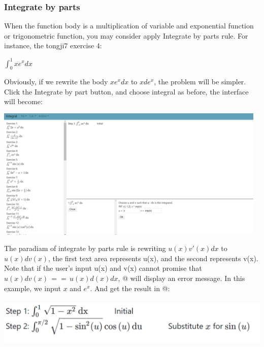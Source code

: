 \documentclass[titlepage]{article}
\makeatletter
\newcommand*{\rom}[1]{\expandafter\@slowromancap\romannumeral #1@}
\makeatother
\begin{document}
\subsubsection{Integrate by parts}
When the function body is a multiplication of variable and exponential function or trigonometric function, you may consider apply Integrate by parts rule. For instance, the tongji7 exercise 4:
\begin{center}
$\int_{0}^{1} xe^{x} dx$
\end{center}
Obviously, if we rewrite the body $xe^{x} dx$ to $x de^{x}$, the problem will be simpler. Click the \colorbox{mygray}{Integrate by part} button, and choose integral as before, the interface will become:\\
\includegraphics[width=13cm, height=7cm]{14.png}\\
The paradiam of integrate by parts rule is rewriting $u(x)v'(x)dx$ to $u(x)dv(x)$, the first text area represents u(x), and the second represents v(x). Note that if the user's input u(x) and v(x) cannot promise that $u(x)dv(x)\,==\,u(x)d(x)dx$, \rom{5} will display an error message. In this example, we input $x$ and $e^{x}$. And get the result in \rom{3}:\\\\
\includegraphics{30.png}\\
\end{document}
